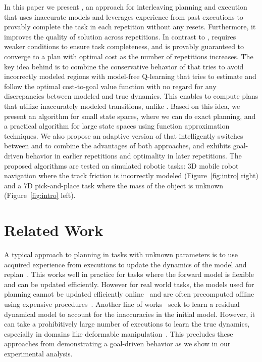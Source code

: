 In this paper we present \cmaxpp{}, an approach for interleaving
planning and execution that uses inaccurate models and leverages
experience from past executions to provably complete the task in each
repetition without any resets. Furthermore, it improves the quality of
solution across
repetitions. In contrast to \cmax{}, \cmaxpp{} requires weaker conditions to
ensure task completeness, and is provably guaranteed to
converge to a plan with optimal cost as the number of repetitions
increases.
The key idea behind \cmaxpp{} is to combine the conservative behavior
of \cmax{} that tries to avoid incorrectly modeled regions with
model-free Q-learning that tries to estimate and follow the optimal
cost-to-goal value function with no regard for any discrepancies
between modeled and true dynamics.
This enables \cmaxpp{} to compute plans that utilize
inaccurately modeled transitions, unlike \cmax{}. Based on this idea,
we present an algorithm
for small state
spaces, where we can do exact planning, and a practical algorithm for
large state spaces using function approximation techniques. We also propose
an adaptive version of \cmaxpp{} that intelligently switches between 
\cmax{} and \cmaxpp{} to combine the advantages of both approaches, and exhibits
goal-driven behavior in earlier repetitions and optimality in later repetitions.
The proposed algorithms are tested on simulated robotic tasks: 3D
mobile robot navigation where the track friction is incorrectly
modeled (Figure~\ref{fig:intro} right) and a 7D pick-and-place
task where the mass of the object is unknown (Figure~\ref{fig:intro} left).


\section{Related Work}
\label{sec:related-work}

A typical approach to planning in tasks with unknown parameters is to
use acquired experience from executions to update the dynamics of the
model and replan~\cite{DBLP:journals/sigart/Sutton91}. This works well
in practice for tasks where the forward model is flexible and can be
updated efficiently. However for real world tasks, the models used for
planning cannot be updated efficiently
online~\cite{DBLP:conf/iros/TodorovET12} and are often precomputed
offline using expensive
procedures~\cite{DBLP:conf/wafr/HauserBHL06}. Another line of works~\cite{DBLP:conf/iros/SaverianoYFL17,DBLP:conf/icml/AbbeelQN06}
seek to learn a residual dynamical model to account for the
inaccuracies in the initial model. However, it can take a
prohibitively large number of executions to learn the true dynamics,
especially in domains like deformable
manipulation~\cite{essahbi2012}. This precludes these approaches from
demonstrating a goal-driven behavior as we show in our experimental analysis.


